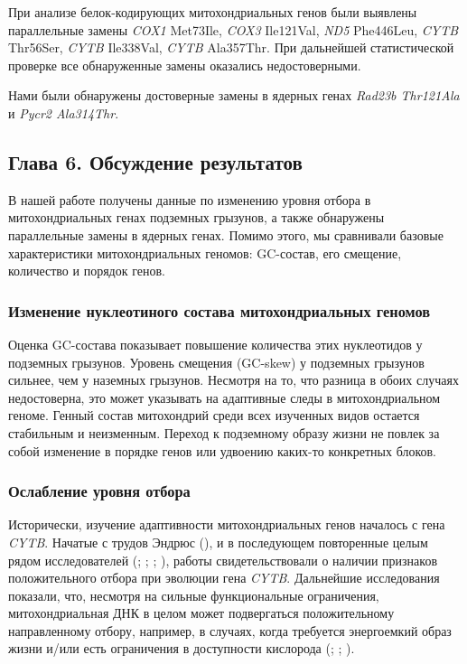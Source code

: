 При анализе белок-кодирующих митохондриальных генов были выявлены параллельные замены \textit{COX1} Met73Ile, \textit{COX3} Ile121Val, \textit{ND5} Phe446Leu, \textit{CYTB} Thr56Ser, \textit{CYTB} Ile338Val, \textit{CYTB} Ala357Thr. При дальнейшей статистической проверке все обнаруженные замены оказались недостоверными. 

Нами были обнаружены достоверные замены в ядерных генах \textit{Rad23b Thr121Ala} и \textit{Pycr2 Ala314Thr}.


\subsection*{Глава 6. Обсуждение результатов}

В нашей работе получены данные по изменению уровня отбора в митохондриальных генах подземных грызунов, а также обнаружены параллельные замены в ядерных генах. Помимо этого, мы сравнивали базовые характеристики митохондриальных геномов: GC-состав, его смещение, количество и порядок генов. 

\subsubsection*{Изменение нуклеотиного состава митохондриальных геномов}
Оценка GC-состава показывает повышение количества этих нуклеотидов у подземных грызунов. Уровень смещения (GC-skew) у подземных грызунов сильнее, чем у наземных грызунов. Несмотря на то, что разница в обоих случаях недостоверна, это может указывать на адаптивные следы в митохондриальном геноме. Генный состав митохондрий среди всех изученных видов остается стабильным и неизменным. Переход к подземному образу жизни не повлек за собой изменение в порядке генов или удвоению каких-то конкретных блоков.


\subsubsection*{Ослабление уровня отбора}
Исторически, изучение адаптивности митохондриальных генов началось с гена \textit{CYTB}. Начатые с трудов Эндрюс (\cite{Andrews1998}), и в последующем повторенные целым рядом исследователей (\cite{Tomasco2014}; \cite{DaSilva2009}; \cite{DiRocco2006}; \cite{Shao2015}), работы свидетельствовали о наличии признаков положительного отбора при эволюции гена \textit{CYTB}. Дальнейшие исследования показали, что, несмотря на сильные функциональные ограничения, митохондриальная ДНК в целом может подвергаться положительному направленному отбору, например, в случаях, когда требуется энергоемкий образ жизни и/или есть ограничения в доступности кислорода (\cite{Tomasco2011}; \cite{Shen2010}; \cite{Blier2001}).

